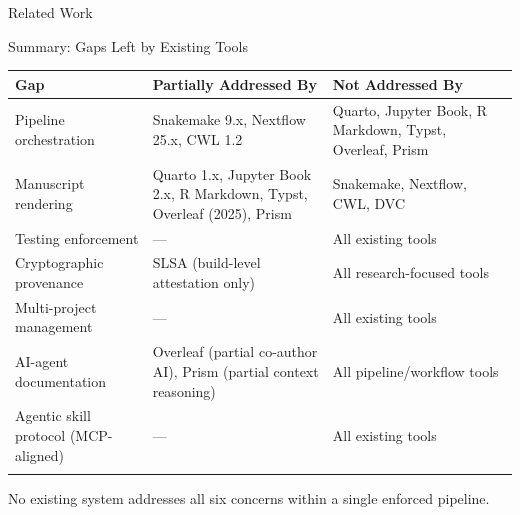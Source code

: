 \documentclass[
  ignorenonframetext,
]{beamer}
\newcounter{none} %
\begin{document}
\begin{frame}[fragile]{Related Work}
\begin{block}{Summary: Gaps Left by Existing Tools}
{\def\LTcaptype{none} %
\begin{longtable}[]{@{}
  >{\raggedright\arraybackslash}p{}
  >{\raggedright\arraybackslash}p{}
  >{\raggedright\arraybackslash}p{}@{}}
\toprule\noalign{}
\begin{minipage}[b]{\linewidth}\raggedright
Gap
\end{minipage} & \begin{minipage}[b]{\linewidth}\raggedright
Partially Addressed By
\end{minipage} & \begin{minipage}[b]{\linewidth}\raggedright
Not Addressed By
\end{minipage} \\
\midrule\noalign{}
\endhead
Pipeline orchestration & Snakemake 9.x, Nextflow 25.x, CWL 1.2 & Quarto,
Jupyter Book, R Markdown, Typst, Overleaf, Prism \\
Manuscript rendering & Quarto 1.x, Jupyter Book 2.x, R Markdown, Typst,
Overleaf (2025), Prism & Snakemake, Nextflow, CWL, DVC \\
Testing enforcement & --- & All existing tools \\
Cryptographic provenance & SLSA (build-level attestation only) & All
research-focused tools \\
Multi-project management & --- & All existing tools \\
AI-agent documentation & Overleaf (partial co-author AI), Prism (partial
context reasoning) & All pipeline/workflow tools \\
Agentic skill protocol (MCP-aligned) & --- & All existing tools \\
\bottomrule\noalign{}
\end{longtable}
}

No existing system addresses all six concerns within a single enforced
pipeline.
\end{block}
\end{frame}
\end{document}
